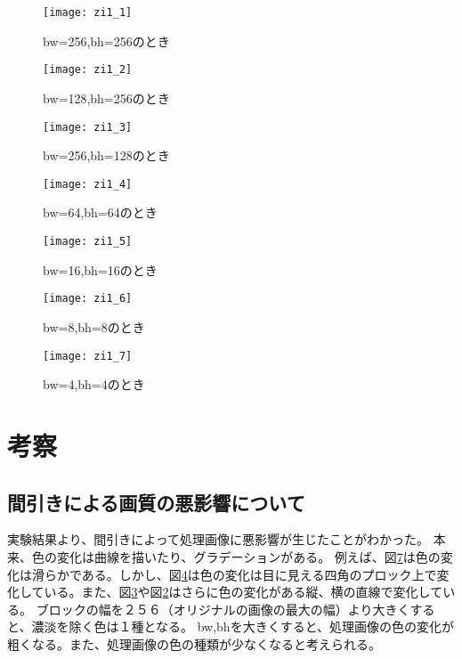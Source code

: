 \documentclass[a4j]{jsarticle}
\begin{document}
\begin{figure}
  \centering
  \texttt{[image: zi1\_1]}
  \caption{bw=256,bh=256のとき}
  \label{pic:zi1_1}
\end{figure}

\begin{figure}
  \centering
  \texttt{[image: zi1\_2]}
  \caption{bw=128,bh=256のとき}
  \label{pic:zi1_2}
\end{figure}

\begin{figure}
  \centering
  \texttt{[image: zi1\_3]}
  \caption{bw=256,bh=128のとき}
  \label{pic:zi1_3}
\end{figure}

\begin{figure}
  \centering
  \texttt{[image: zi1\_4]}
  \caption{bw=64,bh=64のとき}
  \label{pic:zi1_4}
\end{figure}

\begin{figure}
  \centering
  \texttt{[image: zi1\_5]}
  \caption{bw=16,bh=16のとき}
  \label{pic:zi1_5}
\end{figure}

\begin{figure}
  \centering
  \texttt{[image: zi1\_6]}
  \caption{bw=8,bh=8のとき}
  \label{pic:zi1_6}
\end{figure}

\begin{figure}
  \centering
  \texttt{[image: zi1\_7]}
  \caption{bw=4,bh=4のとき}
  \label{pic:zi1_7}
\end{figure}

\section{考察}
\subsection{間引きによる画質の悪影響について}
実験結果より、間引きによって処理画像に悪影響が生じたことがわかった。
本来、色の変化は曲線を描いたり、グラデーションがある。
例えば、図\ref{pic:zi1_7}は色の変化は滑らかである。しかし、図\ref{pic:zi1_4}は色の変化は目に見える四角のプロック上で変化している。また、図\ref{pic:zi1_3}や図\ref{pic:zi1_2}はさらに色の変化がある縦、横の直線で変化している。
ブロックの幅を２５６（オリジナルの画像の最大の幅）より大きくすると、濃淡を除く色は１種となる。
bw,bhを大きくすると、処理画像の色の変化が粗くなる。また、処理画像の色の種類が少なくなると考えられる。
\end{document}
